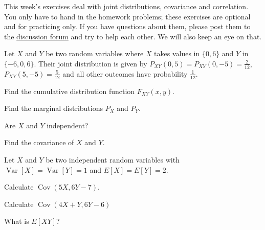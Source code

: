 \documentclass[a4paper,10pt,landscape,twocolumn]{scrartcl}
\DeclareMathOperator{\Cov}{Cov}
\DeclareMathOperator{\Var}{Var}
\begin{document}
\practiceproblems

{\sffamily\noindent
  This week's exercises deal with joint distributions, covariance and
  correlation. You only have to hand in the homework problems; these exercises
  are optional and for practicing only. If you have questions about them,
  please post them to the \href{\discussionForumURL}{discussion forum} and try
  to help each other. We will also keep an eye on that.
}


\begin{exercise}[]
  Let $X$ and $Y$ be two random variables where $X$ takes values in $\{0, 6\}$
  and $Y$ in $\{-6, 0, 6\}$. Their joint distribution is given by 
  $P_{XY}(0,5) = P_{XY}(0, -5) = \frac{2}{12}$, $P_{XY}(5,-5) = \frac{5}{12}$
  and all other outcomes have probability $\frac{1}{12}$.

  \begin{subex}
    Find the cumulative distribution function $F_{XY}(x,y)$.	
  \end{subex}
  
  \begin{subex}
    Find the marginal distributions $P_X$ and $P_Y$.	
  \end{subex}
  
  \begin{subex}
    Are $X$ and $Y$ independent?	
  \end{subex}
  
  \begin{subex}
    Find the covariance of $X$ and $Y$.
  \end{subex}
\end{exercise}


\begin{exercise}[]
  Let $X$ and $Y$ be two independent random variables with 
  $\Var[X] = \Var[Y] = 1$ and $E[X] = E[Y] = 2$.

  \begin{subex}
    Calculate $\Cov(5X,6Y - 7)$.
  \end{subex}
  
  \begin{subex}
    Calculate $\Cov(4X + Y, 6Y-6)$	
  \end{subex}
  
  \begin{subex}
    What is $E[XY]$?	
  \end{subex}
\end{exercise}
\end{document}
